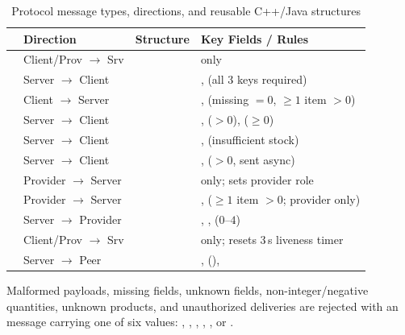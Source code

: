 \documentclass{../latex/utmreport}
\begin{document}
\begin{table}[H]\centering
\caption{Protocol message types, directions, and reusable C++/Java structures}\label{tab:protocol}
\begin{tabularx}{\textwidth}{|p{}|p{}|p{}|Y|}\hline
{} & Direction & Structure & Key Fields / Rules \\\hline
{} & Client/Prov $\to$ Srv &  &  only \\\hline
{} & Server $\to$ Client &  & ,  (all 3 keys required) \\\hline
{} & Client $\to$ Server &  & ,  (missing $=0$, $\ge 1$ item $>0$) \\\hline
{} & Server $\to$ Client &  & ,  ($>0$),  ($\ge 0$) \\\hline
{} & Server $\to$ Client &  & ,  (insufficient stock) \\\hline
{} & Server $\to$ Client &  & ,  ($>0$, sent async) \\\hline
{} & Provider $\to$ Server &  &  only; sets provider role \\\hline
{} & Provider $\to$ Server &  & ,  ($\ge 1$ item $>0$; provider only) \\\hline
{} & Server $\to$ Provider &  & , ,  ($0\text{--}4$) \\\hline
{} & Client/Prov $\to$ Srv &  &  only; resets 3\,s liveness timer \\\hline
{} & Server $\to$ Peer &  & ,  (),  \\\hline
\end{tabularx}
\end{table}

Malformed payloads, missing fields, unknown fields, non-integer/negative quantities, unknown products, and unauthorized deliveries are rejected with an  message carrying one of six  values: , , , , , or .
\end{document}
